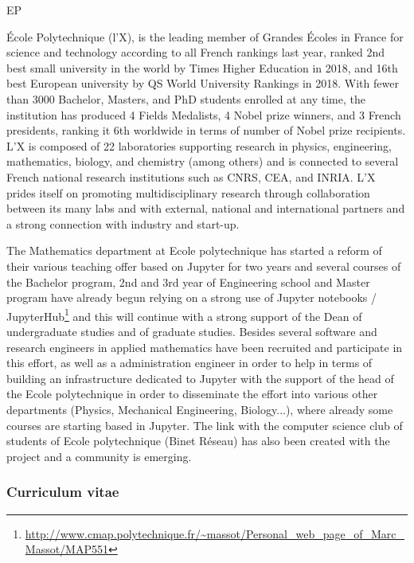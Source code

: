 \begin{sitedescription}{EP}

\'Ecole Polytechnique (l'X), is the leading member of Grandes \'Ecoles in France
for science and technology according to all French rankings last year, ranked
2nd best small university in the world by Times Higher Education in 2018, and
16th best European university by QS World University Rankings in 2018. With
fewer than 3000 Bachelor, Masters, and PhD students enrolled at any time, the
institution has produced 4 Fields Medalists, 4 Nobel prize winners, and 3 French
presidents, ranking it 6th worldwide in terms of number of Nobel prize
recipients. L'X is composed of 22 laboratories supporting research in physics,
engineering, mathematics, biology, and chemistry (among others) and is connected
to several French national research institutions such as CNRS, CEA, and INRIA.
L'X prides itself on promoting multidisciplinary research through collaboration
between its many labs and with external, national and international partners and
a strong connection with industry and start-up.

The Mathematics department at Ecole polytechnique has started a reform of their
various teaching offer based on Jupyter for two years and several courses of the
Bachelor program, 2nd and 3rd year of Engineering school and Master program have
already begun relying on a strong use of Jupyter notebooks /
JupyterHub\footnote{\url{http://www.cmap.polytechnique.fr/~massot/Personal_web_page_of_Marc_Massot/MAP551}} and this will continue with a strong support of the Dean of
undergraduate studies and of graduate studies. Besides several software and
research engineers in applied mathematics have been recruited and participate in
this effort, as well as a administration engineer in order to help in terms of
building an infrastructure dedicated to Jupyter with the support of the head of
the Ecole polytechnique in order to disseminate the effort into various other
departments (Physics, Mechanical Engineering, Biology...), where already some
courses are starting based in Jupyter. The link with the computer science club
of students of Ecole polytechnique (Binet R\'eseau) has also been created with
the project and a community is emerging.

\subsubsection*{Curriculum vitae}


\end{sitedescription}
